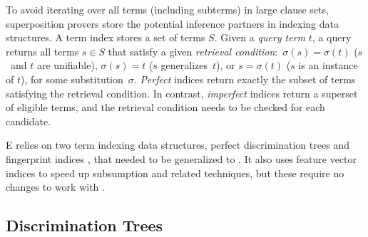 To avoid iterating over all terms (including subterms) in large clause
sets, superposition provers store the potential inference partners in
indexing data structures. A term index stores a set of terms $\mathit{S}.$
Given a \emph{query term}
%
$t$, a query returns all terms $s \in \mathit{S}$ that satisfy a given
\emph{retrieval condition}:\ $\sigma(s) = \sigma(t)$ ($s$~and $t$ are
unifiable), $\sigma(s) = t$ ($s$ generalizes~$t$), or $s = \sigma(t)$
($s$ is an instance of $t$), for some substitution~$\sigma.$
\emph{Perfect} indices return exactly the subset of terms satisfying
the retrieval condition. In contrast, \emph{imperfect} indices return
a superset of eligible terms, and the retrieval condition needs to be
checked for each candidate.

E relies on two term indexing data structures, perfect discrimination
trees \cite{mcc-92-pdts} and fingerprint indices
\cite{ss-12-fp-indexing}, that needed to be generalized to
\lfhol. It also uses feature vector indices
\cite{ss-2013-feature-vector} to speed up subsumption and
related techniques, but these require no changes to work
with \lfhol{}.

\subsection{Discrimination Trees}

